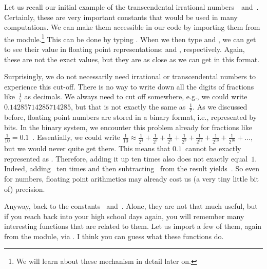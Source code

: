%
Let us recall our initial example of the transcendental irrational numbers~\numberPi\ and~\numberE.
Certainly, these are very important constants that would be used in many computations.
We can make them accessible in our code by importing them from the  module.\footnote{%
We will learn about these mechanism in detail later on.}
This can be done by typing .
When we then type  and , we can get to see their value in floating point representations:  and , respectively.
Again, these are not the exact values, but they are as close as we can get in this format.

Surprisingly, we do not necessarily need irrational or transcendental numbers to experience this cut-off.
There is no way to write down all the digits of fractions like~$\frac{1}{7}$ as decimals.
We always need to cut off somewhere, e.g., we could write~$0.14285714285714285$, but that is not exactly the same as~$\frac{1}{7}$.
As we discussed before, floating point numbers are stored in a binary format, i.e., represented by bits.
In the binary system, we encounter this problem already for fractions like~$\frac{1}{10}=0.1$~\cite{PSF:P3D:TPT:FPAIAL}.
Essentially, we could write $\frac{1}{10}\approx\frac{1}{2^4}+\frac{1}{2^5}+\frac{1}{2^8}+\frac{1}{2^9}+\frac{1}{2^{12}}+\frac{1}{2^{13}}+\frac{1}{2^{16}}+\dots$, but we would never quite get there.
This means that $0.1$~cannot be exactly represented as .
Therefore, adding it up ten times also does not exactly equal~$1$.
Indeed, adding~ ten times and then subtracting~ from the result yields~.
So even for  numbers, floating point arithmetics may already cost us (a very tiny little bit of) precision.

Anyway, back to the constants \numberPi\ and~\numberE.
Alone, they are not that much useful, but if you reach back into your high school days again, you will remember many interesting functions that are related to them.
Let us import a few of them, again from the  module, via .
I think you can guess what these functions do.

